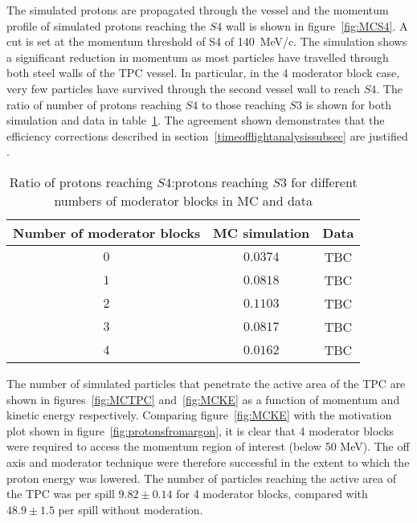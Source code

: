 The simulated protons are propagated through the vessel and the momentum profile of simulated protons reaching the $\mathit{S4}$ wall is shown in figure~\ref{fig:MCS4}. A cut is set at the momentum threshold of S4 of 140~MeV/c. The simulation shows a significant reduction in momentum as most particles have travelled through both steel walls of the TPC vessel. In particular, in the 4 moderator block case, very few particles have survived through the second vessel wall to reach $\mathit{S4}$. The ratio of number of protons reaching $\mathit{S4}$ to those reaching $\mathit{S3}$ is shown for both simulation and data in table~\ref{tab:ratios}. The agreement shown demonstrates that the efficiency corrections described in section~\ref{timeofflightanalysissubsec} are justified .

\begin{table}
  \centering
  \caption{Ratio of protons reaching $\mathit{S4}$:protons reaching $\mathit{S3}$ for different numbers of moderator blocks in MC and data}
  \begin{tabular}{|c|c|c|}
    \hline
    Number of moderator blocks & MC simulation & Data \\
    \hline
    $0$ & $0.0374$ & TBC \\
    $1$ & $0.0818$ & TBC \\
    $2$ & $0.1103$ & TBC \\
    $3$ & $0.0817$ & TBC \\
    $4$ & $0.0162$ & TBC \\
    \hline
  \end{tabular}
  \label{tab:ratios}
\end{table}

The number of simulated particles that penetrate the active area of the TPC are shown in figures~\ref{fig:MCTPC} and~\ref{fig:MCKE} as a function of momentum and kinetic energy respectively. Comparing figure~\ref{fig:MCKE} with the motivation plot shown in figure~\ref{fig:protonsfromargon}, it is clear that 4 moderator blocks were required to access the momentum region of interest (below 50 MeV). The off axis and moderator technique were therefore successful in the extent to which the proton energy was lowered.
The number of particles reaching the active area of the TPC was  per spill $9.82 \pm  0.14$ for 4 moderator blocks, compared with $48.9 \pm 1.5$ per spill without moderation.

